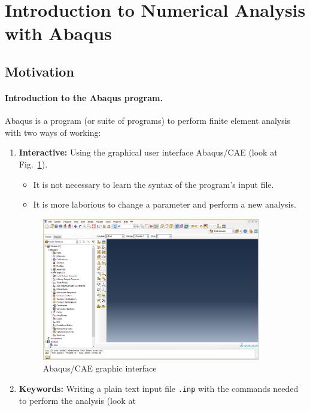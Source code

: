 \section{Introduction to Numerical Analysis with Abaqus}

\subsection{Motivation}

\paragraph{Introduction to the Abaqus program.} Abaqus is a program
(or suite of programs) to perform finite element analysis with two
ways of working:
\begin{enumerate}
\item \textbf{Interactive:} Using the graphical user interface Abaqus/CAE (look at Fig.~\ref{figu10}).
  \begin{itemize}
  \item It is not necessary to learn the syntax of the program's input
    file.
  \item It is more laborious to change a parameter and perform a new 
    analysis.
  \end{itemize}
  \begin{figure}[!h]
    \begin{center}
      \includegraphics[width=0.9\textwidth]{./body/images/imagen10}
    \end{center}
    \caption{Abaqus/CAE graphic interface}
    \label{figu10}
  \end{figure}
\item \textbf{Keywords:} Writing a plain text input file \texttt{.inp}
  with the commands needed to perform the analysis (look at

\end{enumerate}
